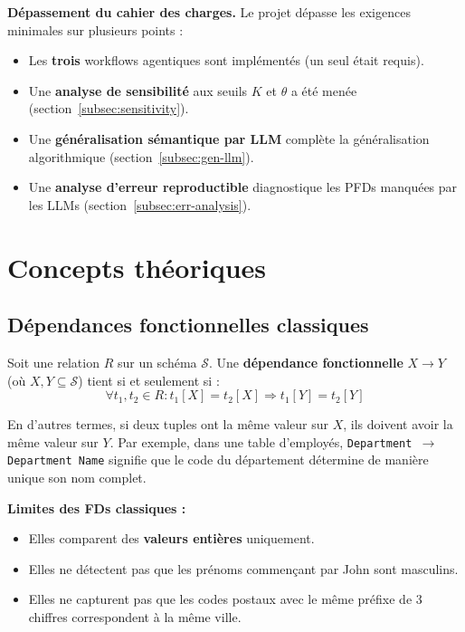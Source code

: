 \documentclass[12pt,a4paper]{article}
\begin{document}
\textbf{D\'{e}passement du cahier des charges.} Le projet d\'{e}passe les exigences minimales sur plusieurs points :
\begin{itemize}
    \item Les \textbf{trois} workflows agentiques sont impl\'{e}ment\'{e}s (un seul \'{e}tait requis).
    \item Une \textbf{analyse de sensibilit\'{e}} aux seuils $K$ et $\theta$ a \'{e}t\'{e} men\'{e}e (section~\ref{subsec:sensitivity}).
    \item Une \textbf{g\'{e}n\'{e}ralisation s\'{e}mantique par LLM} compl\`{e}te la g\'{e}n\'{e}ralisation algorithmique (section~\ref{subsec:gen-llm}).
    \item Une \textbf{analyse d'erreur reproductible} diagnostique les PFDs manqu\'{e}es par les LLMs (section~\ref{subsec:err-analysis}).
\end{itemize}

\section{Concepts th\'{e}oriques}
\label{sec:concepts}

\subsection{D\'{e}pendances fonctionnelles classiques}

\begin{tcolorbox}[colback=blue!5!white, colframe=blue!50!black, title=D\'{e}finition -- D\'{e}pendance Fonctionnelle]
Soit une relation $R$ sur un sch\'{e}ma $\mathcal{S}$. Une \textbf{d\'{e}pendance fonctionnelle} $X \rightarrow Y$ (o\`{u} $X, Y \subseteq \mathcal{S}$) tient si et seulement si :
$$\forall t_1, t_2 \in R : t_1[X] = t_2[X] \Rightarrow t_1[Y] = t_2[Y]$$
\end{tcolorbox}

En d'autres termes, si deux tuples ont la m\^{e}me valeur sur $X$, ils doivent avoir la m\^{e}me valeur sur $Y$. Par exemple, dans une table d'employ\'{e}s, \texttt{Department $\rightarrow$ Department Name} signifie que le code du d\'{e}partement d\'{e}termine de mani\`{e}re unique son nom complet.

\textbf{Limites des FDs classiques :}
\begin{itemize}
    \item Elles comparent des \textbf{valeurs enti\`{e}res} uniquement.
    \item Elles ne d\'{e}tectent pas que les pr\'{e}noms commen\c{c}ant par \og{}John\fg{} sont masculins.
    \item Elles ne capturent pas que les codes postaux avec le m\^{e}me pr\'{e}fixe de 3 chiffres correspondent \`{a} la m\^{e}me ville.
\end{itemize}
\end{document}
